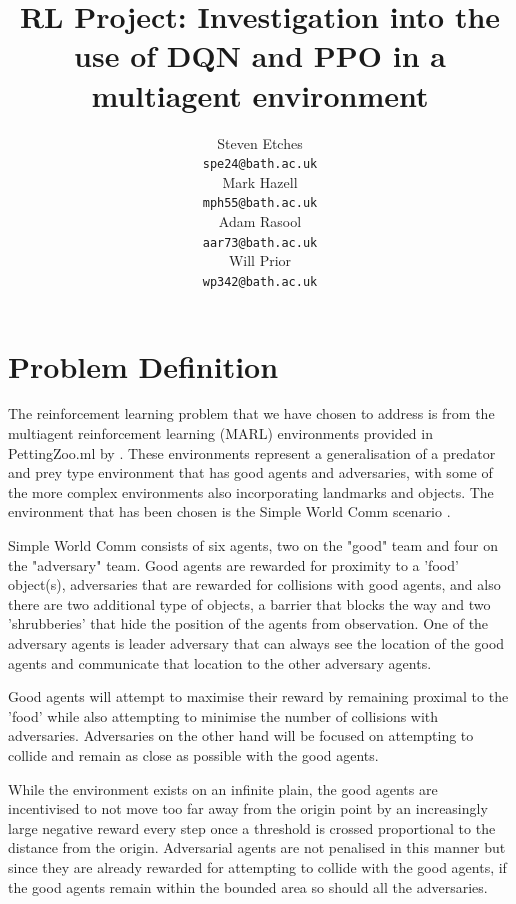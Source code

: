 \documentclass{article}
\title{RL Project: Investigation into the use of DQN and PPO in a multiagent environment}
\author{
  Steven Etches \\
  \texttt{spe24@bath.ac.uk} \\
  \And
  Mark Hazell \\
  \texttt{mph55@bath.ac.uk} \\
  \And
  Adam Rasool \\
  \texttt{aar73@bath.ac.uk} \\
  \And
  Will Prior \\
  \texttt{wp342@bath.ac.uk}
}
\begin{document}
\maketitle

\section{Problem Definition} \label{Problem Definition}

The reinforcement learning problem that we have chosen to address is from the multiagent reinforcement learning (MARL) environments provided in PettingZoo.ml by \citet{terry2020pettingzoo}.
These environments represent a generalisation of a predator and prey type environment that has good agents and adversaries, with some of the more complex environments also incorporating landmarks and objects.
The environment that has been chosen is the Simple World Comm scenario \citet{mordatch2017emergence}.

Simple World Comm consists of six agents, two on the "good" team and four on the "adversary" team.
Good agents are rewarded for proximity to a 'food' object(s), adversaries that are rewarded for collisions with good agents, and also there are two additional type of objects, a barrier that blocks the way and two 'shrubberies' that hide the position of the agents from observation.
One of the adversary agents is leader adversary that can always see the location of the good agents and communicate that location to the other adversary agents.

Good agents will attempt to maximise their reward by remaining proximal to the 'food' while also attempting to minimise the number of collisions with adversaries.
Adversaries on the other hand will be focused on attempting to collide and remain as close as possible with the good agents.

While the environment exists on an infinite plain, the good agents are incentivised to not move too far away from the origin point by an increasingly large negative reward every step once a threshold is crossed proportional to the distance from the origin.
Adversarial agents are not penalised in this manner but since they are already rewarded for attempting to collide with the good agents, if the good agents remain within the bounded area so should all the adversaries.
\end{document}
